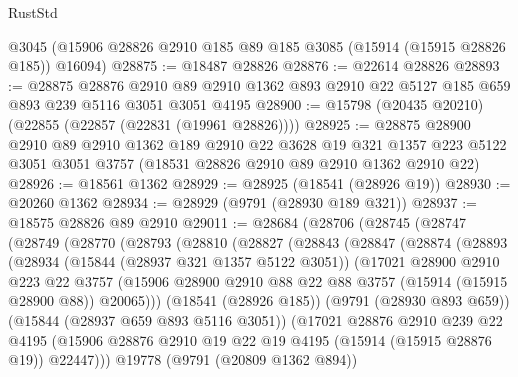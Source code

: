 \begin{lexlean}{RustStd}
\begin{coremodule}
    @3045
    (@15906 @28826 @2910 @185 @89 @185 @3085 (@15914 (@15915 @28826 @185)) @16094)
@28875 := @18487 @28826
@28876 := @22614 @28826
@28893 := @28875
    @28876
    @2910
    @89
    @2910
    @1362
    @893
    @2910
    @22
    @5127
    @185
    @659
    @893
    @239
    @5116
    @3051
    @3051
    @4195
@28900 := @15798 (@20435 @20210) (@22855 (@22857 (@22831 (@19961 @28826))))
@28925 := @28875
    @28900
    @2910
    @89
    @2910
    @1362
    @189
    @2910
    @22
    @3628
    @19
    @321
    @1357
    @223
    @5122
    @3051
    @3051
    @3757
    (@18531 @28826 @2910 @89 @2910 @1362 @2910 @22)
@28926 := @18561 @1362
@28929 := @28925 (@18541 (@28926 @19))
@28930 := @20260 @1362
@28934 := @28929 (@9791 (@28930 @189 @321))
@28937 := @18575 @28826 @89 @2910
@29011 := @28684
    (@28706
      (@28745
        (@28747
          (@28749
            (@28770
              (@28793
                (@28810
                  (@28827
                    (@28843
                      (@28847
                        (@28874
                          (@28893
                            (@28934
                              (@15844 (@28937 @321 @1357 @5122 @3051))
                              (@17021
                                @28900
                                @2910
                                @223
                                @22
                                @3757
                                (@15906
                                  @28900
                                  @2910
                                  @88
                                  @22
                                  @88
                                  @3757
                                  (@15914 (@15915 @28900 @88))
                                  @20065)))
                            (@18541 (@28926 @185))
                            (@9791 (@28930 @893 @659))
                            (@15844 (@28937 @659 @893 @5116 @3051))
                            (@17021
                              @28876
                              @2910
                              @239
                              @22
                              @4195
                              (@15906
                                @28876
                                @2910
                                @19
                                @22
                                @19
                                @4195
                                (@15914 (@15915 @28876 @19))
                                @22447)))
                          @19778
                          (@9791 (@20809 @1362 @894))

\end{coremodule}
\end{lexlean}
